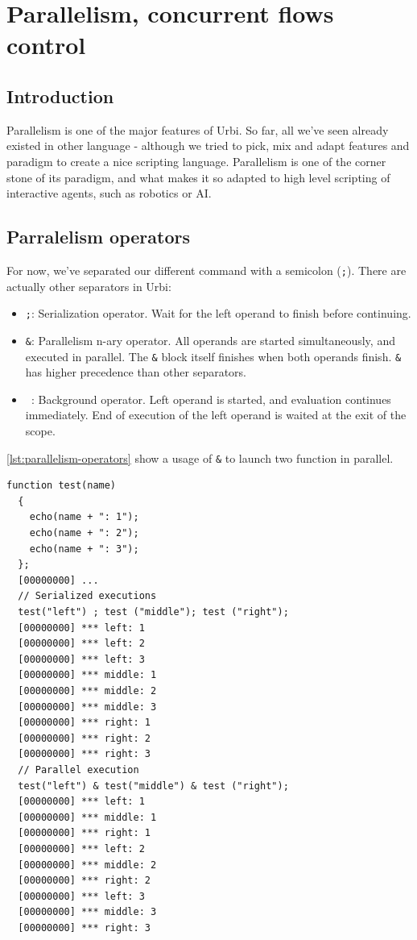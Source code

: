 \documentclass[openright,twoside,12pt]{report}
\newcommand{\ai}{AI\xspace}
\newcommand{\urbi}{Urbi\xspace}
\newcommand{\lst}[1]{\autoref{lst:#1}}
\begin{document}

\chapter{Parallelism, concurrent flows control}

\section{Introduction}

Parallelism is one of the major features of \urbi. So far, all we've
seen already existed in other language - although we tried to pick,
mix and adapt features and paradigm to create a nice scripting
language. Parallelism is one of the corner stone of its paradigm, and
what makes it so adapted to high level scripting of interactive
agents, such as robotics or \ai.

\section{Parralelism operators}

For now, we've separated our different command with a semicolon
(\texttt{;}). There are actually other separators in \urbi:

\begin{itemize}
\item \texttt{;}: Serialization operator. Wait for the left operand to
  finish before continuing.
\item \texttt{\&}: Parallelism n-ary operator. All operands are
  started simultaneously, and executed in parallel. The \texttt{\&}
  block itself finishes when both operands finish. \texttt{\&} has
  higher precedence than other separators.
\item \texttt{\,}: Background operator. Left operand is started, and
  evaluation continues immediately. End of execution of the left
  operand is waited at the exit of the scope.
\end{itemize}

\lst{parallelism-operators} show a usage of \texttt{\&} to launch two
function in parallel.

\begin{lstlisting}[caption=Parallelism operator,
  label=lst:parallelism-operators]
  function test(name)
  {
    echo(name + ": 1");
    echo(name + ": 2");
    echo(name + ": 3");
  };
  [00000000] ...
  // Serialized executions
  test("left") ; test ("middle"); test ("right");
  [00000000] *** left: 1
  [00000000] *** left: 2
  [00000000] *** left: 3
  [00000000] *** middle: 1
  [00000000] *** middle: 2
  [00000000] *** middle: 3
  [00000000] *** right: 1
  [00000000] *** right: 2
  [00000000] *** right: 3
  // Parallel execution
  test("left") & test("middle") & test ("right");
  [00000000] *** left: 1
  [00000000] *** middle: 1
  [00000000] *** right: 1
  [00000000] *** left: 2
  [00000000] *** middle: 2
  [00000000] *** right: 2
  [00000000] *** left: 3
  [00000000] *** middle: 3
  [00000000] *** right: 3
\end{lstlisting}
\end{document}
